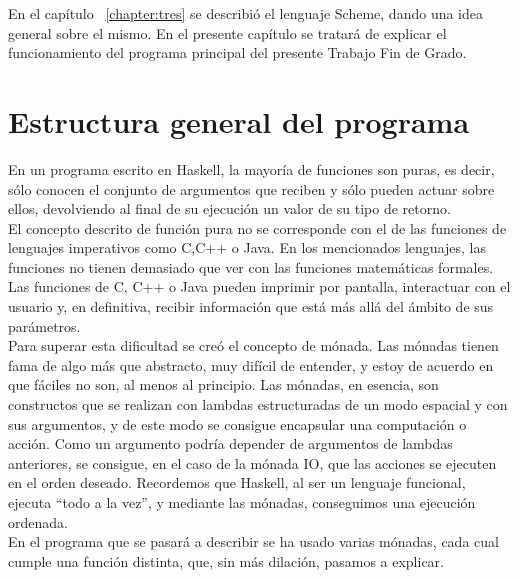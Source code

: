 

En el cap\'itulo ~\ref{chapter:tres} se describi\'o el lenguaje Scheme, dando una idea general sobre el mismo. En el presente cap\'itulo se tratar\'a de explicar el funcionamiento del programa principal del presente Trabajo Fin de Grado.\\

\section{Estructura general del programa}
\label{3:sec1}

En un programa escrito en Haskell, la mayor\'ia de funciones son puras, es decir, s\'olo conocen el conjunto de argumentos que reciben y s\'olo pueden actuar sobre ellos, devolviendo al final de su ejecuci\'on un valor de su tipo de retorno.\\

El concepto descrito de funci\'on pura no se corresponde con el de las funciones de lenguajes imperativos como C,C++ o Java. En los mencionados lenguajes, las funciones no tienen demasiado que ver con las funciones matem\'aticas formales. Las funciones de C, C++ o Java pueden imprimir por pantalla, interactuar con el usuario y, en definitiva, recibir informaci\'on que est\'a m\'as all\'a del \'ambito de sus par\'ametros.\\

Para superar esta dificultad se cre\'o el concepto de m\'onada. Las m\'onadas tienen fama de algo m\'as que abstracto, muy dif\'icil de entender, y estoy de acuerdo en que f\'aciles no son, al menos al principio. Las m\'onadas, en esencia, son constructos que se realizan con lambdas estructuradas de un modo espacial y con sus argumentos, y de este modo se consigue encapsular una computaci\'on o acci\'on. Como un argumento podr\'ia depender de argumentos de lambdas anteriores, se consigue, en el caso de la m\'onada IO, que las acciones se ejecuten en el orden deseado. Recordemos que Haskell, al ser un lenguaje funcional, ejecuta ``todo a la vez'', y mediante las m\'onadas, conseguimos una ejecuci\'on ordenada.\\

En el programa que se pasar\'a a describir se ha usado varias m\'onadas, cada cual cumple una funci\'on distinta, que, sin m\'as dilaci\'on, pasamos a explicar.\\

